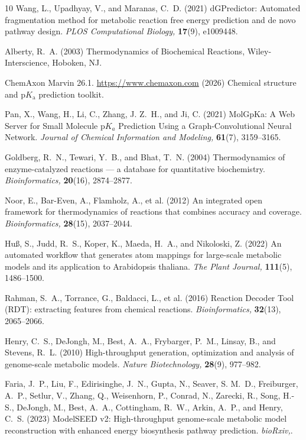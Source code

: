 \documentclass[unnumsec,webpdf,modern,large]{oup-authoring-template}
\begin{document}
\begin{thebibliography}{10}
Wang, L., Upadhyay, V., and Maranas, C.~D. (2021)
{dGPredictor}: Automated fragmentation method for metabolic reaction free
  energy prediction and de novo pathway design.
{\em PLOS Computational Biology,} {\bf 17}(9), e1009448.

Alberty, R.~A. (2003)
Thermodynamics of Biochemical Reactions,
Wiley-Interscience, Hoboken, NJ.

{ChemAxon}
{Marvin} 26.1.
\url{https://www.chemaxon.com} (2026)
Chemical structure and p$K_\mathrm{a}$ prediction toolkit.

Pan, X., Wang, H., Li, C., Zhang, J. Z.~H., and Ji, C. (2021)
{MolGpKa}: A Web Server for Small Molecule $\mathrm{p}K_a$ Prediction Using a
  Graph-Convolutional Neural Network.
{\em Journal of Chemical Information and Modeling,} {\bf 61}(7), 3159--3165.

Goldberg, R.~N., Tewari, Y.~B., and Bhat, T.~N. (2004)
Thermodynamics of enzyme-catalyzed reactions --- a database for quantitative
  biochemistry.
{\em Bioinformatics,} {\bf 20}(16), 2874--2877.

Noor, E., Bar-Even, A., Flamholz, A., et al. (2012)
An integrated open framework for thermodynamics of reactions that combines
  accuracy and coverage.
{\em Bioinformatics,} {\bf 28}(15), 2037--2044.

Hu{\ss}, S., Judd, R.~S., Koper, K., Maeda, H.~A., and Nikoloski, Z. (2022)
An automated workflow that generates atom mappings for large-scale metabolic
  models and its application to {A}rabidopsis thaliana.
{\em The Plant Journal,} {\bf 111}(5), 1486--1500.

Rahman, S.~A., Torrance, G., Baldacci, L., et al. (2016)
Reaction Decoder Tool ({RDT}): extracting features from chemical reactions.
{\em Bioinformatics,} {\bf 32}(13), 2065--2066.

Henry, C.~S., DeJongh, M., Best, A.~A., Frybarger, P.~M., Linsay, B., and
  Stevens, R.~L. (2010)
High-throughput generation, optimization and analysis of genome-scale metabolic
  models.
{\em Nature Biotechnology,} {\bf 28}(9), 977--982.

Faria, J.~P., Liu, F., Edirisinghe, J.~N., Gupta, N., Seaver, S. M.~D.,
  Freiburger, A.~P., Setlur, V., Zhang, Q., Weisenhorn, P., Conrad, N.,
  Zarecki, R., Song, H.-S., DeJongh, M., Best, A.~A., Cottingham, R.~W., Arkin,
  A.~P., and Henry, C.~S. (2023)
{ModelSEED} v2: High-throughput genome-scale metabolic model reconstruction
  with enhanced energy biosynthesis pathway prediction.
{\em bioRxiv,}.


\end{thebibliography}
\end{document}
